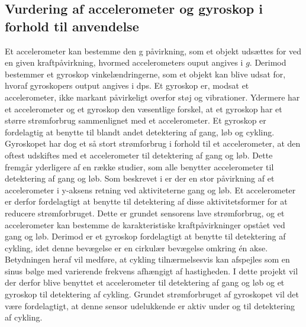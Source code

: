 \subsection{Vurdering af accelerometer og gyroskop i forhold til anvendelse}\label{acc_og_gyro}
Et accelerometer kan bestemme den g påvirkning, som et objekt udsættes for ved en given kraftpåvirkning, hvormed accelerometers ouput angives i $g$. Derimod bestemmer et gyroskop vinkelændringerne, som et objekt kan blive udsat for, hvoraf gyroskopers output angives i dps. Et gyroskop er, modsat et accelerometer, ikke markant påvirkeligt overfor støj og vibrationer. \citep{Goodrich2013,TittertonWeston2004,LuingeVeltink2005} \newline
Ydermere har et accelerometer og et gyroskop den væsentlige forskel, at et gyroskop har et større strømforbrug sammenlignet med et accelerometer. Et gyroskop er fordelagtig at benytte til blandt andet detektering af gang, løb og cykling. Gyroskopet har dog et så stort strømforbrug i forhold til et accelerometer, at den oftest udskiftes med et accelerometer til detektering af gang og løb. Dette fremgår yderligere af en række studier, som alle benytter accelerometer til detektering af gang og løb. \citep{Rueterbories2010,Sparkfun,ClelandKikhia2013} \newline
Som beskrevet i  er der en stor påvirkning af et accelerometer i y-aksens retning ved aktiviteterne gang og løb. Et accelerometer er derfor fordelagtigt at benytte til detektering af disse aktivitetsformer for at reducere strømforbruget. Dette er grundet sensorens lave strømforbrug, og et accelerometer kan bestemme de karakteristiske kraftpåvirkninger opstået ved gang og løb. Derimod er et gyroskop fordelagtigt at benytte til detektering af cykling, idet denne bevægelse er en cirkulær bevægelse omkring én akse. Betydningen heraf vil medføre, at cykling tilnærmelsesvis kan afspejles som en sinus bølge med varierende frekvens afhængigt af hastigheden. \citep{TittertonWeston2004,LuingeVeltink2005} \newline
I dette projekt vil der derfor blive benyttet et accelerometer til detektering af gang og løb og et gyroskop til detektering af cykling. Grundet strømforbruget af gyroskopet vil det være fordelagtigt, at denne sensor udelukkende er aktiv under og til detektering af cykling.%
